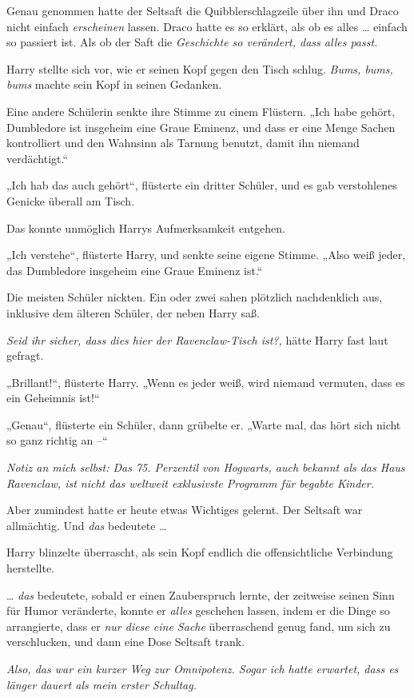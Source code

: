 {Genau genommen hatte der Seltsaft die Quibblerschlagzeile über ihn und Draco nicht einfach \emph{erscheinen} lassen. Draco hatte es so erklärt, als ob es alles … einfach so passiert ist. Als ob der Saft die \emph{Geschichte so verändert, dass alles passt.}

Harry stellte sich vor, wie er seinen Kopf gegen den Tisch schlug. \emph{Bums, bums, bums} machte sein Kopf in seinen Gedanken.

Eine andere Schülerin senkte ihre Stimme zu einem Flüstern. „Ich habe gehört, Dumbledore ist insgeheim eine Graue Eminenz, und dass er eine Menge Sachen kontrolliert und den Wahnsinn als Tarnung benutzt, damit ihn niemand verdächtigt.“

„Ich hab das auch gehört“, flüsterte ein dritter Schüler, und es gab verstohlenes Genicke überall am Tisch.

Das konnte unmöglich Harrys Aufmerksamkeit entgehen.

„Ich verstehe“, flüsterte Harry, und senkte seine eigene Stimme. „Also weiß jeder, das Dumbledore insgeheim eine Graue Eminenz ist.“

Die meisten Schüler nickten. Ein oder zwei sahen plötzlich nachdenklich aus, inklusive dem älteren Schüler, der neben Harry saß.

\emph{Seid ihr sicher, dass dies hier der Ravenclaw-Tisch ist?,} hätte Harry fast laut gefragt.

„Brillant!“, flüsterte Harry. „Wenn es jeder weiß, wird niemand vermuten, dass es ein Geheimnis ist!“

„Genau“, flüsterte ein Schüler, dann grübelte er. „Warte mal, das hört sich nicht so ganz richtig an --“

\emph{Notiz an mich selbst: Das 75. Perzentil von Hogwarts, auch bekannt als das Haus Ravenclaw, ist nicht das weltweit exklusivste Programm für begabte Kinder.}

Aber zumindest hatte er heute etwas Wichtiges gelernt. Der Seltsaft war allmächtig. Und \emph{das} bedeutete …

Harry blinzelte überrascht, als sein Kopf endlich die offensichtliche Verbindung herstellte.

… \emph{das} bedeutete, sobald er einen Zauberspruch lernte, der zeitweise seinen Sinn für Humor veränderte, konnte er \emph{alles} geschehen lassen, indem er die Dinge so arrangierte, dass er \emph{nur diese eine Sache} überraschend genug fand, um sich zu verschlucken, und dann eine Dose Seltsaft trank.

\emph{Also, das war ein kurzer Weg zur Omnipotenz. Sogar ich hatte erwartet, dass es länger dauert als mein erster Schultag.}

}

